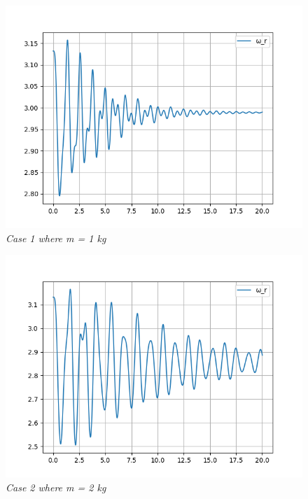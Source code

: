         \begin{figure}[H]
            \centering
            \includegraphics{Appendix/RSimPictures/F/fm1.png}
            \caption{\textit{Case 1 where m = 1 kg}}
            \label{}
        \end{figure}
            
        \begin{figure}
            \centering
            \includegraphics{Appendix/RSimPictures/F/fm2.png}
            \caption{\textit{Case 2 where m = 2 kg}}
            \label{}
        \end{figure}
            
